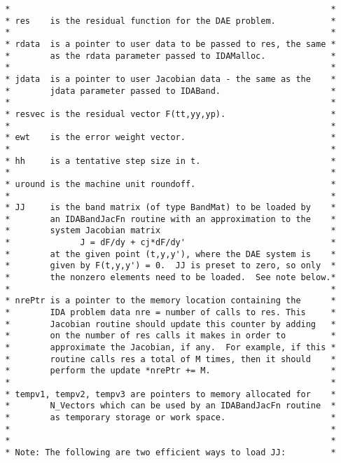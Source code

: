 \begin{verbatim}
 *                                                                *
 * res    is the residual function for the DAE problem.           *
 *                                                                *
 * rdata  is a pointer to user data to be passed to res, the same *
 *        as the rdata parameter passed to IDAMalloc.             *
 *                                                                *
 * jdata  is a pointer to user Jacobian data - the same as the    *
 *        jdata parameter passed to IDABand.                      *
 *                                                                *
 * resvec is the residual vector F(tt,yy,yp).                     *
 *                                                                *
 * ewt    is the error weight vector.                             *
 *                                                                *
 * hh     is a tentative step size in t.                          *
 *                                                                *
 * uround is the machine unit roundoff.                           *
 *                                                                *
 * JJ     is the band matrix (of type BandMat) to be loaded by    *
 *        an IDABandJacFn routine with an approximation to the    *
 *        system Jacobian matrix                                  *
 *              J = dF/dy + cj*dF/dy'                             *
 *        at the given point (t,y,y'), where the DAE system is    *
 *        given by F(t,y,y') = 0.  JJ is preset to zero, so only  *
 *        the nonzero elements need to be loaded.  See note below.*
 *                                                                *
 * nrePtr is a pointer to the memory location containing the      *
 *        IDA problem data nre = number of calls to res. This     *
 *        Jacobian routine should update this counter by adding   *
 *        on the number of res calls it makes in order to         *
 *        approximate the Jacobian, if any.  For example, if this *
 *        routine calls res a total of M times, then it should    *
 *        perform the update *nrePtr += M.                        *
 *                                                                *
 * tempv1, tempv2, tempv3 are pointers to memory allocated for    *
 *        N_Vectors which can be used by an IDABandJacFn routine  *
 *        as temporary storage or work space.                     *
 *                                                                *
 *                                                                *
 * Note: The following are two efficient ways to load JJ:         *

\end{verbatim}
